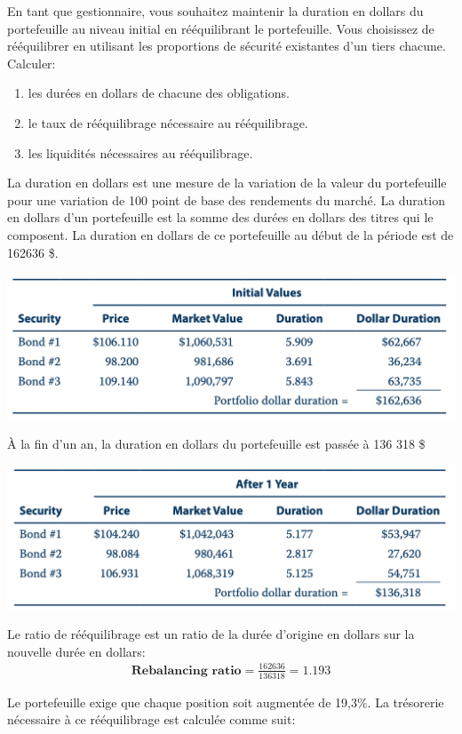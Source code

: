\documentclass[12pt]{article}
\begin{document}
\begin{itemize}
En tant que gestionnaire, vous souhaitez maintenir la duration en dollars du portefeuille au niveau initial en rééquilibrant le portefeuille. Vous choisissez de rééquilibrer en utilisant les proportions de sécurité existantes d'un tiers chacune.  Calculer:
\begin{enumerate}
\item les durées en dollars de chacune des obligations.
\item le taux de rééquilibrage nécessaire au rééquilibrage.
\item les liquidités nécessaires au rééquilibrage.
\end{enumerate}

La duration en dollars est une mesure de la variation de la valeur du portefeuille pour une variation de 100 point de base des rendements du marché.  La duration en dollars d’un portefeuille est la somme des durées en dollars des titres qui le composent. La duration en dollars de ce portefeuille au début de la période est de 162636 \$.

\includegraphics[width=14cm]{11}


À la fin d’un an, la duration en dollars du portefeuille est passée à 136 318 \$

\includegraphics[width=14cm]{12}

Le ratio de rééquilibrage est un ratio de la durée d'origine en dollars sur la nouvelle durée en dollars:
\begin{align*}
\textbf{Rebalancing ratio} =\frac{162636}{136318} = 1.193
\end{align*}

Le portefeuille exige que chaque position soit augmentée de 19,3\%. La trésorerie nécessaire à ce rééquilibrage est calculée comme suit:


\end{itemize}
\end{document}
